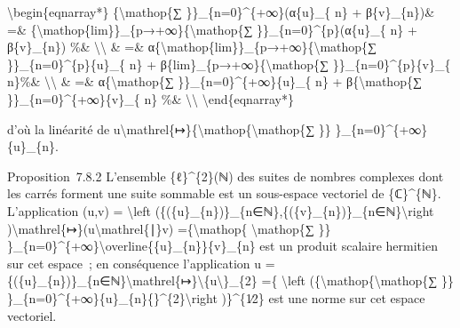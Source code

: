 \documentclass[]{article}
\begin{document}
\textbackslash{}begin\{eqnarray*\} \{\textbackslash{}mathop\{∑
\}\}\_\{n=0\}\^{}\{+∞\}(α\{u\}\_\{ n\} + β\{v\}\_\{n\})\& =\&
\{\textbackslash{}mathop\{lim\}\}\_\{p→+∞\}\{\textbackslash{}mathop\{∑
\}\}\_\{n=0\}\^{}\{p\}(α\{u\}\_\{ n\} + β\{v\}\_\{n\}) \%\&
\textbackslash{}\textbackslash{} \& =\&
α\{\textbackslash{}mathop\{lim\}\}\_\{p→+∞\}\{\textbackslash{}mathop\{∑
\}\}\_\{n=0\}\^{}\{p\}\{u\}\_\{ n\} +
β\{lim\}\_\{p→+∞\}\{\textbackslash{}mathop\{∑
\}\}\_\{n=0\}\^{}\{p\}\{v\}\_\{ n\}\%\& \textbackslash{}\textbackslash{}
\& =\& α\{\textbackslash{}mathop\{∑ \}\}\_\{n=0\}\^{}\{+∞\}\{u\}\_\{ n\}
+ β\{\textbackslash{}mathop\{∑ \}\}\_\{n=0\}\^{}\{+∞\}\{v\}\_\{ n\} \%\&
\textbackslash{}\textbackslash{} \textbackslash{}end\{eqnarray*\}

d'où la linéarité de
u\textbackslash{}mathrel\{↦\}\{\textbackslash{}mathop\{\textbackslash{}mathop\{∑
\}\} \}\_\{n=0\}\^{}\{+∞\}\{u\}\_\{n\}.

Proposition~7.8.2 L'ensemble \{ℓ\}\^{}\{2\}(ℕ) des suites de nombres
complexes dont les carrés forment une suite sommable est un sous-espace
vectoriel de \{ℂ\}\^{}\{ℕ\}. L'application (u,v) = \textbackslash{}left
(\{(\{u\}\_\{n\})\}\_\{n∈ℕ\},\{(\{v\}\_\{n\})\}\_\{n∈ℕ\}\textbackslash{}right
)\textbackslash{}mathrel\{↦\}(u\textbackslash{}mathrel\{∣\}v)
=\{\textbackslash{}mathop\{ \textbackslash{}mathop\{∑ \}\}
\}\_\{n=0\}\^{}\{+∞\}\textbackslash{}overline\{\{u\}\_\{n\}\}\{v\}\_\{n\}
est un produit scalaire hermitien sur cet espace~; en conséquence
l'application u =
\{(\{u\}\_\{n\})\}\_\{n∈ℕ\}\textbackslash{}mathrel\{↦\}\textbackslash{}\textbar{}\{u\textbackslash{}\textbar{}\}\_\{2\}
=\{ \textbackslash{}left
(\{\textbackslash{}mathop\{\textbackslash{}mathop\{∑ \}\}
\}\_\{n=0\}\^{}\{+∞\}\textbar{}\{u\}\_\{n\}\{\textbar{}\}\^{}\{2\}\textbackslash{}right
)\}\^{}\{1∕2\} est une norme sur cet espace vectoriel.
\end{document}
